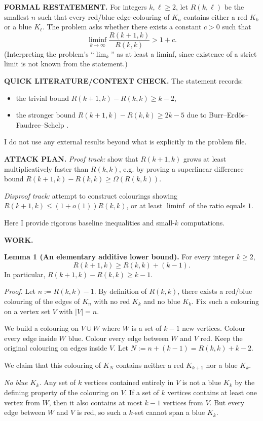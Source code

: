 \textbf{FORMAL RESTATEMENT.}
For integers $k,\ell\ge 2$, let $R(k,\ell)$ be the smallest $n$ such that every red/blue edge-colouring of $K_n$ contains either a red $K_k$ or a blue $K_\ell$.
The problem asks whether there exists a constant $c>0$ such that
\[
\liminf_{k\to\infty}\frac{R(k+1,k)}{R(k,k)} > 1+c.
\]
(Interpreting the problem's ``$\lim_k$'' as at least a liminf, since existence of a strict limit is not known from the statement.)

\textbf{QUICK LITERATURE/CONTEXT CHECK.}
The statement records:
\begin{itemize}
\item the trivial bound $R(k+1,k)-R(k,k)\ge k-2$,
\item the stronger bound $R(k+1,k)-R(k,k)\ge 2k-5$ due to Burr--Erd\H{o}s--Faudree--Schelp \cite{BEFS89}.
\end{itemize}
I do not use any external results beyond what is explicitly in the problem file.

\textbf{ATTACK PLAN.}
\emph{Proof track:} show that $R(k+1,k)$ grows at least multiplicatively faster than $R(k,k)$, e.g. by proving a superlinear difference bound $R(k+1,k)-R(k,k)\ge \Omega(R(k,k))$.

\emph{Disproof track:} attempt to construct colourings showing $R(k+1,k)\le (1+o(1))R(k,k)$, or at least $\liminf$ of the ratio equals $1$.

Here I provide rigorous baseline inequalities and small-$k$ computations.

\textbf{WORK.}

\textbf{Lemma 1 (An elementary additive lower bound).}
For every integer $k\ge 2$,
\[
R(k+1,k) \ge R(k,k) + (k-1).
\]
In particular, $R(k+1,k)-R(k,k)\ge k-1$.

\emph{Proof.}
Let $n:=R(k,k)-1$. By definition of $R(k,k)$, there exists a red/blue colouring of the edges of $K_n$ with no red $K_k$ and no blue $K_k$.
Fix such a colouring on a vertex set $V$ with $|V|=n$.

We build a colouring on $V\cup W$ where $W$ is a set of $k-1$ new vertices.
Colour every edge inside $W$ blue.
Colour every edge between $W$ and $V$ red.
Keep the original colouring on edges inside $V$.
Let $N:=n+(k-1)=R(k,k)+k-2$.

We claim that this colouring of $K_N$ contains neither a red $K_{k+1}$ nor a blue $K_k$.

\emph{No blue $K_k$.}
Any set of $k$ vertices contained entirely in $V$ is not a blue $K_k$ by the defining property of the colouring on $V$.
If a set of $k$ vertices contains at least one vertex from $W$, then it also contains at most $k-1$ vertices from $V$.
But every edge between $W$ and $V$ is red, so such a $k$-set cannot span a blue $K_k$.

